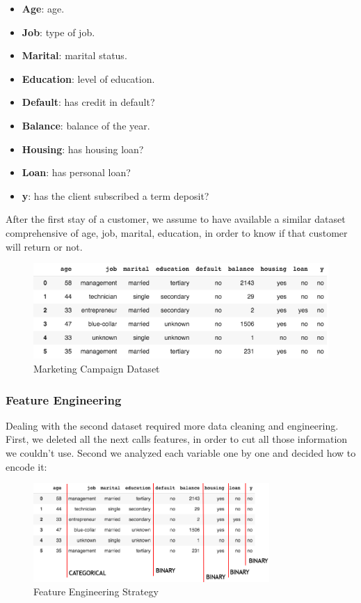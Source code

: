 \begin{itemize}
\item \textbf{Age}: age.
\item \textbf{Job}: type of job.
\item \textbf{Marital}: marital status.
\item \textbf{Education}: level of education.
\item \textbf{Default}: has credit in default?
\item \textbf{Balance}: balance of the year.
\item \textbf{Housing}: has housing loan?
\item \textbf{Loan}: has personal loan?
\item \textbf{y}: has the client subscribed a term deposit?
\end{itemize}

\noindent After the first stay of a customer, we assume to have available a similar dataset comprehensive of age, job, marital, education, in order to know if that customer will return or not.

\begin{figure}[H]
\centering
\includegraphics[width=1\textwidth]{Img/bank_dataset.png}
\caption{Marketing Campaign Dataset}
\end{figure}

\clearpage
\subsubsection{Feature Engineering}
Dealing with the second dataset required more data cleaning and engineering. First, we deleted all the next calls features, in order to cut all those information we couldn't use. Second we analyzed each variable one by one and decided how to encode it:
\begin{figure}[H]
\centering
\includegraphics[width=0.8\textwidth]{Img/feature_recap.png}
\caption{Feature Engineering Strategy}
\end{figure}

